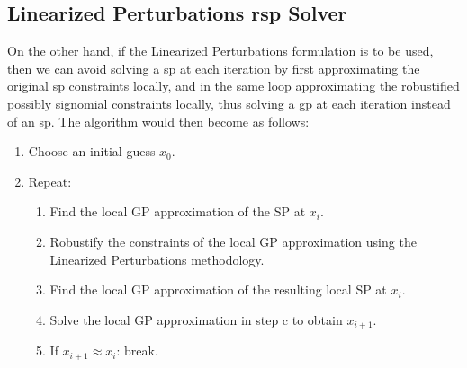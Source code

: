 \subsection{Linearized Perturbations \gls{rsp} Solver}

On the other hand, if the Linearized Perturbations formulation is to be used,
then we can avoid solving a \gls{sp} at each iteration by first
approximating the original \gls{sp} constraints locally, and in the same loop approximating
the robustified possibly signomial constraints locally, thus solving a
\gls{gp} at each iteration instead of an \gls{sp}. The algorithm would then become as follows:

\begin{enumerate}
    \item Choose an initial guess $x_0$.
    \item Repeat:
    \begin{enumerate}
        \item Find the local GP approximation of the SP at $x_i$.
        \item Robustify the constraints of the local GP approximation using the Linearized Perturbations methodology.
        \item Find the local GP approximation of the resulting local SP at $x_i$.
        \item Solve the local GP approximation in step c to obtain $x_{i+1}$.
        \item If $x_{i+1} \approx x_{i}$: break.
    \end{enumerate}
\end{enumerate}
